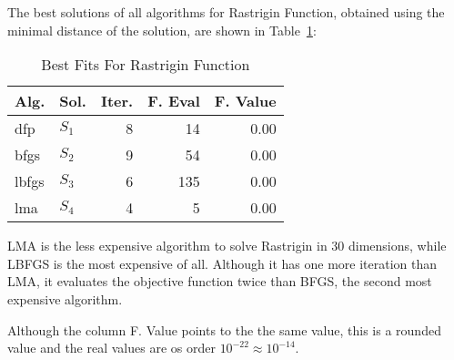 
The best solutions of all algorithms for Rastrigin Function, obtained using the minimal
distance of the solution, are shown in Table~\ref{solutions:rastrigin30d}:

\begin{table}[H]
\centering
\caption{Best Fits For Rastrigin Function}
\label{solutions:rastrigin30d}
\begin{tabular}{llrrr}
\toprule
 Alg. &    Sol. &  Iter. &  F. Eval &  F. Value \\
\midrule
  dfp & $S_{1}$ &      8 &       14 &      0.00 \\
 bfgs & $S_{2}$ &      9 &       54 &      0.00 \\
lbfgs & $S_{3}$ &      6 &      135 &      0.00 \\
  lma & $S_{4}$ &      4 &        5 &      0.00 \\
\bottomrule
\end{tabular}
\end{table}

LMA is the less expensive algorithm to solve Rastrigin in 30 dimensions, while LBFGS
is the most expensive of all. Although it has one more iteration than LMA, it evaluates
the objective function twice than BFGS, the second most expensive algorithm.

Although the column F. Value points to the the same value, this is a rounded value
and the real values are os order $10^{-22} \approx 10^{-14}$.
